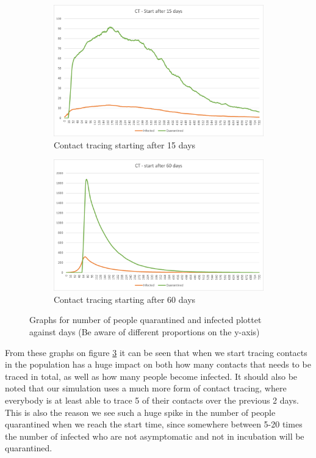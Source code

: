 \begin{figure}[H]
\centering
\begin{subfigure}{.5\textwidth}
  \centering
  \includegraphics[width=.95\linewidth]{0_billeder/CT15Days.png}
  \caption{Contact tracing starting after 15 days}
  \label{Subfig:CT15}
\end{subfigure}%
\begin{subfigure}{.5\textwidth}
  \centering
  \includegraphics[width=.95\linewidth]{0_billeder/CT60Days.png}
  \caption{Contact tracing starting after 60 days}
  \label{Subfig:CT60}
\end{subfigure}
\caption{Graphs for number of people quarantined and infected plottet against days (Be aware of different proportions on the y-axis)}
\label{fig:CTstart1}
\end{figure}
From these graphs on figure \ref{fig:CTstart1} it can be seen that when we start tracing contacts in the population has a huge impact on both how many contacts that needs to be traced in total, as well as how many people become infected. It should also be noted that our simulation uses a much more  form of contact tracing, where everybody is at least able to trace 5 of their contacts over the previous 2 days. This is also the reason we see such a huge spike in the number of people quarantined when we reach the start time, since somewhere between 5-20 times the number of infected who are not asymptomatic and not in incubation will be quarantined.


